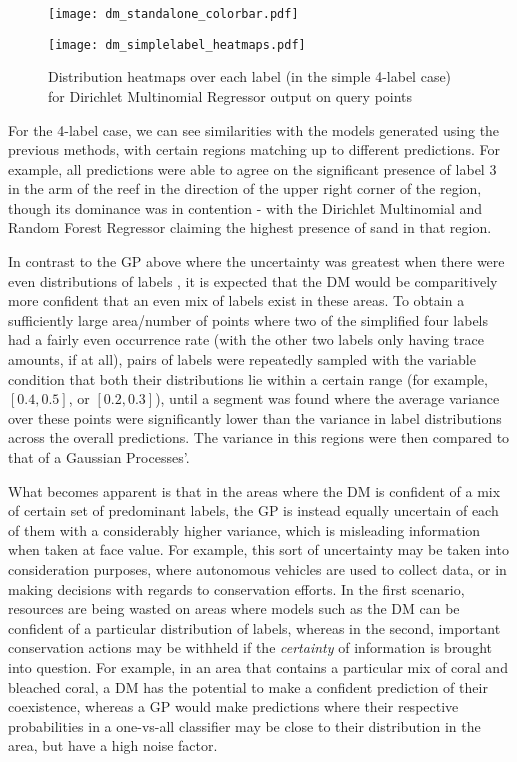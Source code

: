 \begin{figure}
    \begin{minipage}{\linewidth}
        \centerline{\texttt{[image: dm\_standalone\_colorbar.pdf]}}
        \centerline{\texttt{[image: dm\_simplelabel\_heatmaps.pdf]}}
        \caption{Distribution heatmaps over each label (in the simple 4-label case) for Dirichlet Multinomial Regressor output on query points}
        \label{fig:dm_4label_heatmap}
    \end{minipage}
    \hfill
\end{figure}

For the 4-label case, we can see similarities with the models generated using the previous methods, with certain regions matching up to different predictions. For example, all predictions were able to agree on the significant presence of label $3$ in the arm of the reef in the direction of the upper right corner of the region, though its dominance was in contention - with the Dirichlet Multinomial and Random Forest Regressor claiming the highest presence of sand in that region. 

In contrast to the GP above where the uncertainty was greatest when there were even distributions of labels , it is expected that the DM would be comparitively more confident that an even mix of labels exist in these areas. To obtain a sufficiently large area/number of points where two of the simplified four labels had a fairly even occurrence rate (with the other two labels only having trace amounts, if at all), pairs of labels were repeatedly sampled with the variable condition that both their distributions lie within a certain range (for example, $[0.4, 0.5]$, or $[0.2, 0.3]$), until a segment was found where the average variance over these points were significantly lower than the variance in label distributions across the overall predictions. The variance in this regions were then compared to that of a Gaussian Processes'.


What becomes apparent is that in the areas where the DM is confident of a mix of certain set of predominant labels, the GP is instead equally uncertain of each of them with a considerably higher variance, which is misleading information when taken at face value. For example, this sort of uncertainty may be taken into consideration purposes, where autonomous vehicles are used to collect data, or in making decisions with regards to conservation efforts. In the first scenario, resources are being wasted on areas where models such as the DM can be confident of a particular distribution of labels, whereas in the second, important conservation actions may be withheld if the \textit{certainty} of information is brought into question. For example, in an area that contains a particular mix of coral and bleached coral, a DM has the potential to make a confident prediction of their coexistence, whereas a GP would make predictions where their respective probabilities in a one-vs-all classifier may be close to their distribution in the area, but have a high noise factor.

